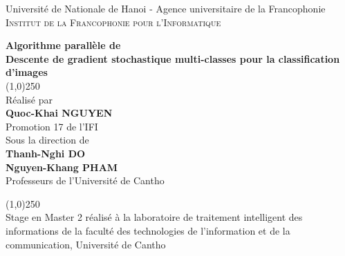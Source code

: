 \begin{titlepage}
\begin{center}
Université de Nationale de Hanoi - Agence universitaire de la Francophonie\\
\normalsize
\textsc{Institut de la Francophonie pour l'Informatique}\\[1.0in]
\end{center}


\begin{flushright}
\Large {\textbf{Algorithme parallèle de \\
Descente de gradient stochastique multi-classes pour la classification d'images}}\\[0.5in]

\line(1,0){250} \\

\normalsize Réalisé par \\
\textbf{Quoc-Khai NGUYEN}\\
Promotion 17 de l'IFI\\[0.5cm]

Sous la direction de \\
{\textbf{Thanh-Nghi DO}}\\
{\textbf{Nguyen-Khang PHAM}}\\
Professeurs de l'Université de Cantho \\[0.5cm]


\vfill

\vspace{0.2cm}

\line(1,0){250} \\
Stage en Master 2 réalisé à la laboratoire de traitement intelligent des informations de la faculté des technologies de l'information et de la communication, Université de Cantho

\end{flushright}
\end{titlepage}
